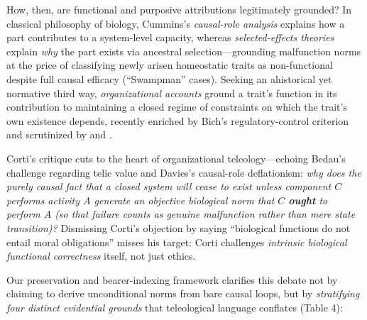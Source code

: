 \documentclass[11pt,a4paper]{article}
\begin{document}
How, then, are functional and purposive attributions legitimately
grounded? In classical philosophy of biology, Cummins's
\citeyearpar{cummins1975} \emph{causal-role analysis} explains how a
part contributes to a system-level capacity, whereas
\emph{selected-effects theories}
\citep{wright1973, millikan1984, neander1991, godfreySmith1994} explain
\emph{why} the part exists via ancestral selection---grounding
malfunction norms at the price of classifying newly arisen homeostatic
traits as non-functional despite full causal efficacy (``Swampman''
cases). Seeking an ahistorical yet normative third way,
\emph{organizational accounts} \citep{mossio2009, montevilMossio2015}
ground a trait's function in its contribution to maintaining a closed
regime of constraints on which the trait's own existence depends,
recently enriched by Bich's \citeyearpar{bich2024} regulatory-control
criterion and scrutinized by \citet{corti2023} and
\citet{cuciniello2026}.

Corti's \citeyearpar[§3]{corti2023} critique cuts to the heart of
organizational teleology---echoing Bedau's \citeyearpar{bedau1992}
challenge regarding telic value and Davies's \citeyearpar{davies2001}
causal-role deflationism: \emph{why does the purely causal fact that a
closed system will cease to exist unless component \(C\) performs
activity \(A\) generate an objective biological norm that \(C\)
\textbf{ought} to perform \(A\) (so that failure counts as genuine
malfunction rather than mere state transition)?} Dismissing Corti's
objection by saying ``biological functions do not entail moral
obligations'' misses his target: Corti challenges \emph{intrinsic
biological functional correctness} itself, not just ethics.

Our preservation and bearer-indexing framework clarifies this debate not
by claiming to derive unconditional norms from bare causal loops, but by
\emph{stratifying four distinct evidential grounds} that teleological
language conflates (Table 4):

\end{document}
